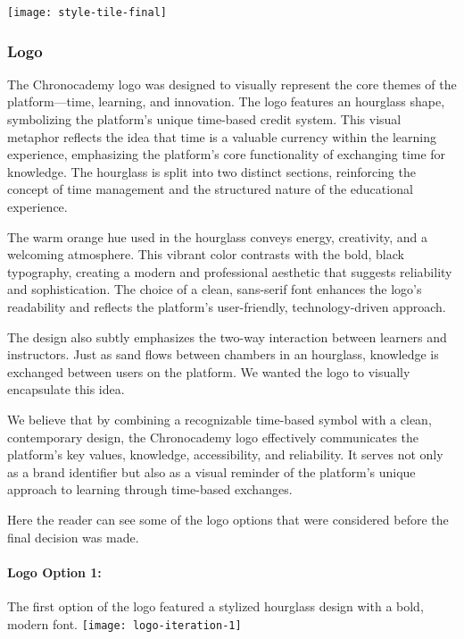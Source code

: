 \texttt{[image: style-tile-final]}

\subsubsection{Logo}\label{subsubsec:logo}
The Chronocademy logo was designed to visually represent the core themes of the platform—time, learning, and innovation.
The logo features an hourglass shape, symbolizing the platform's unique time-based credit system.
This visual metaphor reflects the idea that time is a valuable currency within the learning experience, emphasizing the platform’s core functionality of exchanging time for knowledge.
The hourglass is split into two distinct sections, reinforcing the concept of time management and the structured nature of the educational experience.

The warm orange hue used in the hourglass conveys energy, creativity, and a welcoming atmosphere.
This vibrant color contrasts with the bold, black typography, creating a modern and professional aesthetic that suggests reliability and sophistication.
The choice of a clean, sans-serif font enhances the logo’s readability and reflects the platform’s user-friendly, technology-driven approach.

The design also subtly emphasizes the two-way interaction between learners and instructors.
Just as sand flows between chambers in an hourglass, knowledge is exchanged between users on the platform.
We wanted the logo to visually encapsulate this idea.

We believe that by combining a recognizable time-based symbol with a clean, contemporary design, the Chronocademy logo effectively communicates the platform's key values, knowledge, accessibility, and reliability.
It serves not only as a brand identifier but also as a visual reminder of the platform’s unique approach to learning through time-based exchanges.

Here the reader can see some of the logo options that were considered before the final decision was made.\newline

\paragraph{Logo Option 1:} The first option of the logo featured a stylized hourglass design with a bold, modern font.\newline
\texttt{[image: logo-iteration-1]}\newline

